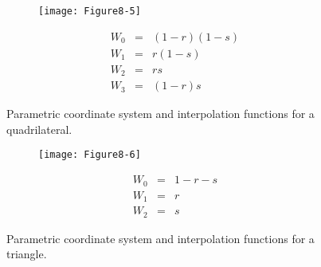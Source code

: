 \begin{description}
    \begin{figure}[!htb]
        \centering
        \begin{subfigure}{0.48\linewidth}
            \centering
            \texttt{[image: Figure8-5]}
            \caption*{}
        \end{subfigure}
        \hfill
        \begin{subfigure}{0.48\linewidth}
            \centering
            \begin{equation*}
            \begin{array}{lll}
            W_0 &=& (1-r)(1 - s) \\
            W_1 &=& r(1 - s) \\
            W_2 &=& r s \\
            W_3 &=& (1 - r)s
            \end{array}
            \end{equation*}
        \end{subfigure}%
        \caption{Parametric coordinate system and interpolation functions for a quadrilateral.}
        \label{fig:Figure8-5}
    \end{figure}

    \begin{figure}[!htb]
        \centering
        \begin{subfigure}{0.48\linewidth}
            \centering
            \texttt{[image: Figure8-6]}
            \caption*{}
        \end{subfigure}
        \hfill
        \begin{subfigure}{0.48\linewidth}
            \centering
            \begin{equation*}
            \begin{array}{lll}
            W_0 &=& 1 - r - s \\
            W_1 &=& r \\
            W_2 &=& s
            \end{array}
            \end{equation*}
        \end{subfigure}%
        \caption{Parametric coordinate system and interpolation functions for a triangle.}
        \label{fig:Figure8-6}
    \end{figure}


\end{description}
